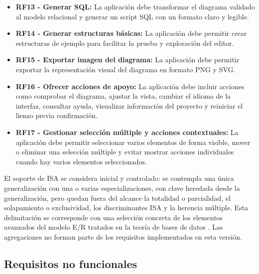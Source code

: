 \begin{itemize}
\item \textbf{RF13 - Generar SQL:} La aplicación debe transformar el diagrama validado al modelo relacional y generar un script SQL con un formato claro y legible.
\item \textbf{RF14 - Generar estructuras básicas:} La aplicación debe permitir crear estructuras de ejemplo para facilitar la prueba y exploración del editor.
\item \textbf{RF15 - Exportar imagen del diagrama:} La aplicación debe permitir exportar la representación visual del diagrama en formato PNG y SVG.
\item \textbf{RF16 - Ofrecer acciones de apoyo:} La aplicación debe incluir acciones como comprobar el diagrama, ajustar la vista, cambiar el idioma de la interfaz, consultar ayuda, visualizar información del proyecto y reiniciar el lienzo previa confirmación.
\item \textbf{RF17 - Gestionar selección múltiple y acciones contextuales:} La aplicación debe permitir seleccionar varios elementos de forma visible, mover o eliminar una selección múltiple y evitar mostrar acciones individuales cuando hay varios elementos seleccionados.
\end{itemize}

El soporte de ISA se considera inicial y controlado: se contempla una única generalización con una o varias especializaciones, con clave heredada desde la generalización, pero quedan fuera del alcance la totalidad o parcialidad, el solapamiento o exclusividad, los discriminantes ISA y la herencia múltiple. Esta delimitación se corresponde con una selección concreta de los elementos avanzados del modelo E/R tratados en la teoría de bases de datos \cite{tema6}. Las agregaciones no forman parte de los requisitos implementados en esta versión.

\subsection{Requisitos no funcionales}

